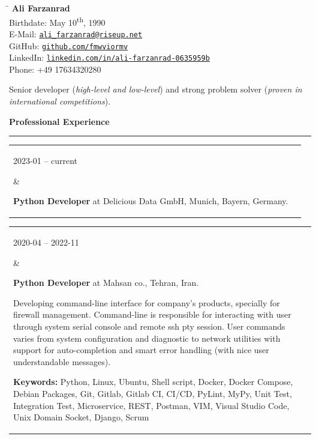 \documentclass[11pt,a4paper,oneside]{article}
\makeatletter
\newcommand{\https}[1]{\href{https://#1}{\nolinkurl{#1}}}
\newcommand{\mailto}[1]{\href{mailto://#1}{\nolinkurl{#1}}}
\newcommand{\keywords}[1]{\textbf{Keywords:} #1}
\renewcommand{\section}[1]{%
{\large\textbf{#1}}\\
\rule[9pt]{18cm}{.4pt}\vspace{-16pt}%
}
\newenvironment{mytable}{%
\begin{tabular}{@{}l@{\hspace{4mm}}l@{}}%
}{\end{tabular}}
\newcommand{\myitem}[2]{%
\parbox[t]{16mm}{#1}&\parbox[t]{16cm}{#2}\\%
}
\makeatother
\begin{document}
%
%
\hspace{1cm}%
\parbox{13cm}{%
\begin{tabbing}%
\hspace{3cm}\=\kill%
\textbf{{\LARGE Ali Farzanrad}}\\[5mm]
Birthdate: \>
May 10\textsuperscript{th}, 1990\\[1mm]
E-Mail: \>
\mailto{ali_farzanrad@riseup.net}\\[1mm]
GitHub: \>
\https{github.com/fmwviormv}\\[1mm]
LinkedIn: \>
\https{linkedin.com/in/ali-farzanrad-0635959b}\\[1mm]
Phone: \>
+49{ }17634320280\\
\end{tabbing}%
}

\vspace{-9pt}%
Senior developer (\textit{high-level and low-level}) and strong
problem solver (\textit{proven in international competitions}).

\section{Professional Experience}

\begin{mytable}
\myitem{2023-01 -- current}{%
\textbf{Python Developer} at
Delicious Data GmbH, Munich, Bayern, Germany.
}
\end{mytable}

\begin{mytable}
\myitem{2020-04 -- 2022-11}{%
\textbf{Python Developer} at
Mahsan co., Tehran, Iran.

Developing command-line interface for company's products,
specially for firewall management.
Command-line is responsible for interacting with user through
system serial console and remote ssh pty session.
User commands varies from system configuration and diagnostic
to network utilities with support for auto-completion and
smart error handling (with nice user understandable messages).

\keywords{%
	Python, Linux, Ubuntu, Shell script, Docker, Docker Compose,
	Debian Packages, Git, Gitlab, Gitlab CI, CI/CD, PyLint, MyPy,
	Unit Test, Integration Test, Microservice, REST, Postman,
	VIM, Visual Studio Code, Unix Domain Socket, Django, Scrum
}
}
\end{mytable}
\end{document}
